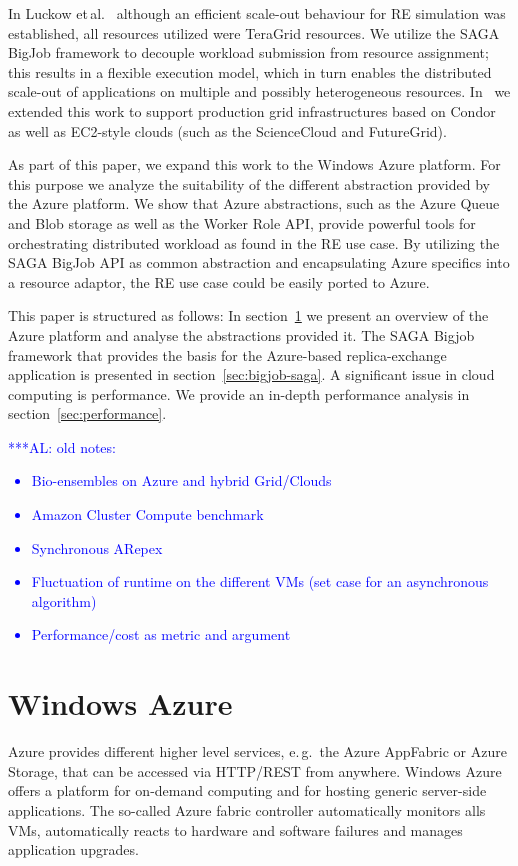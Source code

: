 \documentclass[conference,final]{IEEEtran}
\newcommand{\alnote}[1]{ {\textcolor{blue} { ***AL: #1 }}}
\newcommand{\alnote}[1]{}
\begin{document}
In Luckow et\,al.~\cite{repex_ptrs} although an efficient scale-out 
behaviour for RE simulation was established, all resources
utilized were TeraGrid resources. We utilize the SAGA BigJob framework 
to decouple workload submission from resource assignment; this results 
in a flexible execution model, which in turn enables the distributed 
scale-out of applications on multiple and possibly heterogeneous resources.
In~\cite{10.1109/CCGRID.2010.91} we extended this work to support production 
grid infrastructures based on Condor as well as EC2-style clouds 
(such as the ScienceCloud and FutureGrid). 
 
As part of this paper, we expand this work to the Windows Azure platform. For this purpose
we analyze the suitability of the different abstraction provided by the Azure platform. We show
that Azure abstractions, such as the Azure Queue and Blob storage as well as the Worker Role API, 
provide powerful tools for orchestrating distributed workload as found in the RE use case. 
By utilizing the SAGA BigJob API as common abstraction and encapsulating Azure specifics
into a resource adaptor, the RE use case could be easily ported to Azure.


This paper is structured as follows: In section~\ref{sec:azure} we present an overview of the Azure
platform and analyse the abstractions provided it. The SAGA Bigjob framework that provides the basis
for the Azure-based replica-exchange application is presented in section~\ref{sec:bigjob-saga}.
A significant issue in cloud computing is performance. We provide an in-depth performance analysis 
in section~\ref{sec:performance}.


\alnote{old notes:
\begin{itemize}
    \item Bio-ensembles on Azure and hybrid Grid/Clouds
    \item Amazon Cluster Compute benchmark
    \item Synchronous ARepex
    \item Fluctuation of runtime on the different VMs (set case for an asynchronous algorithm)
    \item Performance/cost as metric and argument
\end{itemize}}


\section{Windows Azure}
\label{sec:azure}
Azure provides different higher level services, e.\,g.\ the Azure
AppFabric or Azure Storage, that can be accessed via HTTP/REST from
anywhere. Windows Azure offers a platform for on-demand computing and
for hosting generic server-side applications. The so-called Azure
fabric controller automatically monitors alls VMs, automatically
reacts to hardware and software failures and manages application
upgrades.
\end{document}
